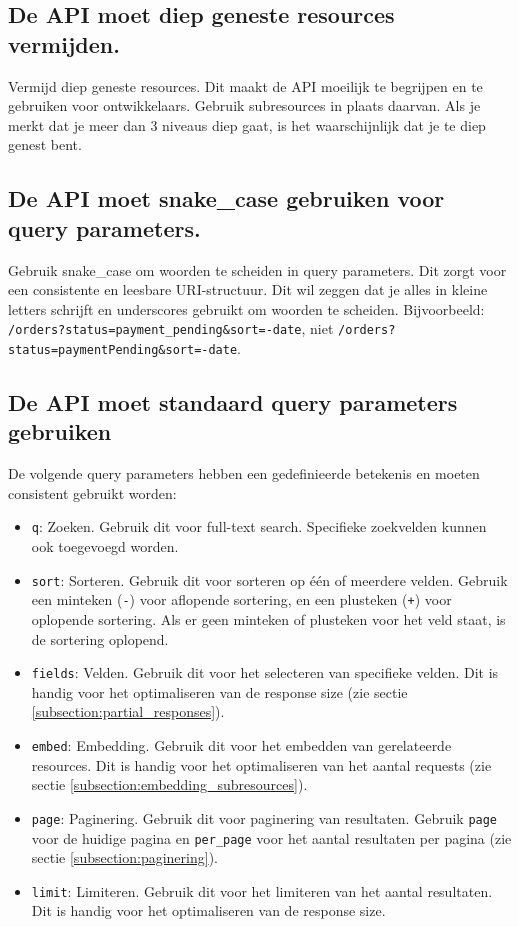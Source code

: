\subsection{De API moet diep geneste resources vermijden.}
\label{section:vermijd_diep_geneste_resources}

Vermijd diep geneste resources. Dit maakt de API moeilijk te begrijpen en te gebruiken voor ontwikkelaars. Gebruik subresources in plaats daarvan. Als je merkt dat je meer dan 3 niveaus diep gaat, is het waarschijnlijk dat je te diep genest bent.

\subsection{De API moet snake\_case gebruiken voor query parameters.}
\label{section:snake_case_query_parameters}

Gebruik snake\_case om woorden te scheiden in query parameters. Dit zorgt voor een consistente en leesbare URI-structuur. Dit wil zeggen dat je alles in kleine letters schrijft en underscores gebruikt om woorden te scheiden. Bijvoorbeeld: \texttt{/orders?status=payment\_pending\&sort=-date}, niet \texttt{/orders?status=paymentPending\&sort=-date}.

\subsection{De API moet standaard query parameters gebruiken}
\label{subsection:standaard_query_parameters}

De volgende query parameters hebben een gedefinieerde betekenis en moeten consistent gebruikt worden:

\begin{itemize}
  \item \texttt{q}: Zoeken. Gebruik dit voor full-text search. Specifieke zoekvelden kunnen ook toegevoegd worden.
  \item \texttt{sort}: Sorteren. Gebruik dit voor sorteren op één of meerdere velden. Gebruik een minteken (\texttt{-}) voor aflopende sortering, en een plusteken (\texttt{+}) voor oplopende sortering. Als er geen minteken of plusteken voor het veld staat, is de sortering oplopend.
  \item \texttt{fields}: Velden. Gebruik dit voor het selecteren van specifieke velden. Dit is handig voor het optimaliseren van de response size (zie sectie \ref{subsection:partial_responses}).
  \item \texttt{embed}: Embedding. Gebruik dit voor het embedden van gerelateerde resources. Dit is handig voor het optimaliseren van het aantal requests (zie sectie \ref{subsection:embedding_subresources}).
  \item \texttt{page}: Paginering. Gebruik dit voor paginering van resultaten. Gebruik \texttt{page} voor de huidige pagina en \texttt{per\_page} voor het aantal resultaten per pagina (zie sectie \ref{subsection:paginering}).
  \item \texttt{limit}: Limiteren. Gebruik dit voor het limiteren van het aantal resultaten. Dit is handig voor het optimaliseren van de response size.
\end{itemize}

